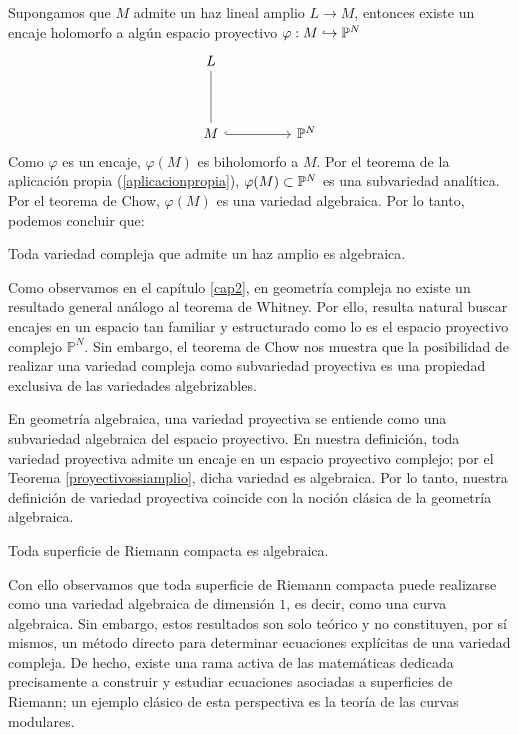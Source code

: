 	Supongamos que $M$ admite un haz lineal amplio $L\longrightarrow M$, entonces existe un encaje holomorfo a algún espacio proyectivo $\varphi:M\hookrightarrow\mathbb{P}^N$
	\[\begin{tikzcd}
		L \\
		\\
		M && {\mathbb{P}^N}
		\arrow[no head, from=1-1, to=3-1]
		\arrow[hook, from=3-1, to=3-3]
	\end{tikzcd}\]
	Como $\varphi$ es un encaje, $\varphi(M)$ es biholomorfo a $M$. Por el teorema de la aplicación propia (\ref{aplicacionpropia}), $\varphi(M)\subset\mathbb{P}^N$ es una subvariedad analítica. Por el teorema de Chow, $\varphi(M)$ es una variedad algebraica. Por lo tanto, podemos concluir que:

\begin{corollary}
	Toda variedad compleja que admite un haz amplio es algebraica.
\end{corollary}

	Como observamos en el capítulo \ref{cap2}, en geometría compleja no existe un resultado general análogo al teorema de Whitney. Por ello, resulta natural buscar encajes en un espacio tan familiar y estructurado como lo es el espacio proyectivo complejo \(\mathbb{P}^N\). Sin embargo, el teorema de Chow nos muestra que la posibilidad de realizar una variedad compleja como subvariedad proyectiva es una propiedad exclusiva de las variedades algebrizables.
	
	En geometría algebraica, una variedad proyectiva se entiende como una subvariedad algebraica del espacio proyectivo. En nuestra definición, toda variedad proyectiva admite un encaje en un espacio proyectivo complejo; por el Teorema \ref{proyectivossiamplio}, dicha variedad es algebraica. Por lo tanto, nuestra definición de variedad proyectiva coincide con la noción clásica de la geometría algebraica.

	\begin{corollary}\label{teoriemann}
		Toda superficie de Riemann compacta es algebraica.
	\end{corollary}
	
	Con ello observamos que toda superficie de Riemann compacta puede realizarse como una variedad algebraica de dimensión $1$, es decir, como una curva algebraica. Sin embargo, estos resultados son solo teórico y no constituyen, por sí mismos, un método directo para determinar ecuaciones explícitas de una variedad compleja. De hecho, existe una rama activa de las matemáticas dedicada precisamente a construir y estudiar ecuaciones asociadas a superficies de Riemann; un ejemplo clásico de esta perspectiva es la teoría de las curvas modulares.
	
